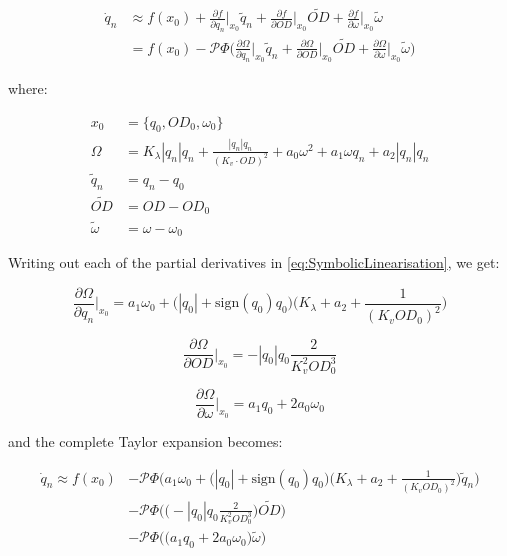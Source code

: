 \begin{equation}\label{eq:SymbolicLinearisation}
	\begin{split}
		\dot{q}_n &\approx f(x_0) + \frac{\partial f}{\partial q_n}\bigg\rvert_{x_0} \tilde{q}_n + \frac{\partial f}{\partial OD}\bigg\rvert_{x_0} \tilde{OD} + \frac{\partial f}{\partial \omega}\bigg\rvert_{x_0} \tilde{\omega} 
		\\
		&= f(x_0) - \mathcal{P}\Phi\Big( \frac{\partial \Omega}{\partial q_n}\bigg\rvert_{x_0} \tilde{q}_n + \frac{\partial \Omega}{\partial OD}\bigg\rvert_{x_0} \tilde{OD} + \frac{\partial \Omega}{\partial \omega}\bigg\rvert_{x_0} \tilde{\omega} \Big)
	\end{split}
\end{equation}

where: 

\begin{align}
	x_0 &= \{q_0,OD_0,\omega_0\} \label{eq:EquilibriumPoint} \\
	\Omega &= K_\lambda|q_n|q_n+\frac{|q_n|q_n}{(K_v\cdot OD)^2}+a_0\omega^2+a_1\omega q_n+a_2|q_n|q_n \label{eq:OmegaFun} \\
	\tilde{q}_n &= q_n - q_0 \label{eq:QTilde} \\
	\tilde{OD} &= OD - OD_0 \label{eq:ODTilde} \\ 
	\tilde{\omega} &= \omega - \omega_0 \label{eq:OmegaTilde} 
\end{align}

Writing out each of the partial derivatives in \cref{eq:SymbolicLinearisation}, we get:

\begin{equation}\label{eq:PartialTaylorQ}
	\frac{\partial \Omega}{\partial q_n}\bigg\rvert_{x_0} 
	=
	a_1\omega_0 + \Big(|q_0|+ \text{sign}(q_0)q_0\Big)\Bigg(K_\lambda + a_2 + \frac{1}{(K_v OD_0)^2}\Bigg) 
\end{equation}

\begin{equation}\label{eq:PartialTaylorOD}
	\frac{\partial \Omega}{\partial OD}\bigg\rvert_{x_0} 
	=
	-|q_0|q_0 \frac{2}{K_v^2 OD_0^3}
\end{equation}

\begin{equation}\label{eq:PartialTaylorOmega}
	\frac{\partial \Omega}{\partial \omega}\bigg\rvert_{x_0} 
	=
	a_1 q_0 + 2a_0\omega_0
\end{equation}

and the complete Taylor expansion becomes:

\begin{equation}\label{eq:SymbolicLinearisationExpanded}
	\begin{split}
			\dot{q}_n \approx f(x_0) &-\mathcal{P}\Phi\Bigg(a_1\omega_0 + \Big(|q_0|+\text{sign}(q_0)q_0\Big)\Bigg(K_\lambda + a_2 + \frac{1}{(K_v OD_0)^2}\Bigg) \tilde{q}_n \Bigg)  \\
			&- \mathcal{P}\Phi\Bigg(\Big(-|q_0|q_0 \frac{2}{K_v^2 OD_0^3}\Big) \tilde{OD}\Bigg) \\
			&-  \mathcal{P}\Phi\Bigg(\Big(a_1 q_0 + 2a_0\omega_0\Big) \tilde{\omega}\Bigg)
	\end{split}
\end{equation}




